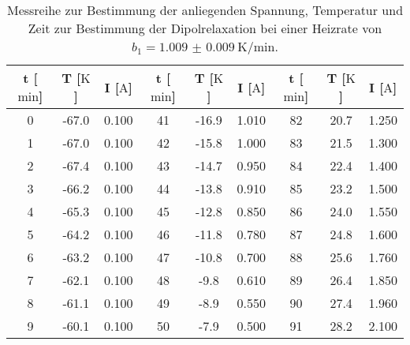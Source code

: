 \begin{table}
    \centering
    \caption{Messreihe zur Bestimmung der anliegenden Spannung, \newline Temperatur und Zeit zur Bestimmung der Dipolrelaxation bei einer Heizrate von $b_1 = \SI{1.009(9)}{\kelvin\per\minute}$.} 
    \label{tab:WhoIsBigInJapan?}
    \begin{tabular}{c c c@{\hskip 1cm}||@{\hskip 1cm} c c c@{\hskip 1cm} ||@{\hskip 1cm} c c c}
        \toprule
        t [$\si{\minute}$] & T [$\si{\kelvin}$] &  I [$\si{\ampere}$] & t [$\si{\minute}$] & T [$\si{\kelvin}$] &  I [$\si{\ampere}$] & t [$\si{\minute}$] & T [$\si{\kelvin}$] &  I [$\si{\ampere}$] \\
        \midrule
0   &    -67.0      &     0.100   & 41  &    -16.9    &       1.010   &  82  &    20.7     &       1.250  \\ 
1   &    -67.0      &     0.100   & 42  &    -15.8    &       1.000   &  83  &    21.5     &       1.300  \\                                        
2   &    -67.4    &       0.100   & 43  &    -14.7    &       0.950   &  84  &    22.4     &       1.400   \\                                    
3   &    -66.2    &       0.100   & 44  &    -13.8    &       0.910   &  85  &    23.2     &       1.500   \\                                      
4   &    -65.3    &       0.100   & 45  &    -12.8    &       0.850   &  86  &    24.0     &       1.550  \\                                      
5   &    -64.2    &       0.100   & 46  &    -11.8    &       0.780   &  87  &    24.8     &       1.600   \\                                      
6   &    -63.2    &       0.100   & 47  &    -10.8    &       0.700    &  88  &    25.6     &       1.760  \\                                      
7   &    -62.1    &       0.100   & 48  &    -9.8     &       0.610   &  89  &    26.4     &       1.850  \\                                      
8   &    -61.1    &       0.100   & 49  &    -8.9     &       0.550   &  90  &    27.4     &       1.960  \\                                      
9   &    -60.1    &       0.100   & 50  &    -7.9     &       0.500    &  91  &    28.2     &       2.100  \\                                      

\end{tabular}
\end{table}
